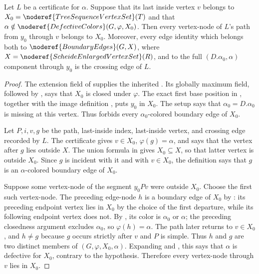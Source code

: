 \begin{helper}
Let $L$ be a  certificate for $\alpha$.
Suppose that its last inside vertex $v$ belongs to
$X_0=\noderef{TreeSequenceVertexSet}(T)$ and that
$\alpha\notin\noderef{DefectiveColors}(G,\varphi,X_0)$.  Then every
vertex-node of $L$'s path from $y_0$ through $v$ belongs to $X_0$.
Moreover, every edge identity which belongs both to
$\noderef{BoundaryEdges}(G,X)$, where
$X=\noderef{ScheideEnlargedVertexSet}(R)$, and to the full
$(D.\alpha_0,\alpha)$ component through $y_0$ is the crossing edge of
$L$.
\end{helper}
\begin{proof}
The extension field of  supplies the
inherited .  Its globally maximum
field, followed by
, says that $X_0$ is closed under
$\varphi$.  The exact first base position in
, together with the image
definition , puts $y_0$ in $X_0$.  The setup
 says that $\alpha_0=D.\alpha_0$ is missing
at this vertex.  Thus
 forbids every $\alpha_0$-colored
boundary edge of $X_0$.

Let $P,i,v,g$ be the path, last-inside index, last-inside vertex, and
crossing edge recorded by $L$.  The certificate gives $v\in X_0$,
$\varphi(g)=\alpha$, and says that the vertex after $g$ lies outside
$X$.  The union formula in  gives
$X_0\subseteq X$, so that latter vertex is outside $X_0$.  Since $g$ is
incident with it and with $v\in X_0$, the definition
 says that $g$ is an $\alpha$-colored boundary edge
of $X_0$.

Suppose some vertex-node of the segment $y_0Pv$ were outside $X_0$.
Choose the first such vertex-node.  The preceding edge-node $h$ is a
boundary edge of $X_0$ by : its preceding endpoint
vertex lies in $X_0$ by the choice of the first departure, while its
following endpoint vertex does not.  By
, its color is $\alpha_0$ or $\alpha$; the
preceding closedness argument excludes $\alpha_0$, so
$\varphi(h)=\alpha$.  The path later returns to $v\in X_0$, and $h\ne g$
because $g$ occurs strictly after $v$ and $P$ is simple.  Thus $h$ and $g$
are two distinct members of
$(G,\varphi,X_0,\alpha)$.  Expanding
 and , this says that
$\alpha$ is defective for $X_0$, contrary to the hypothesis.  Therefore
every vertex-node through $v$ lies in $X_0$.


\end{proof}
